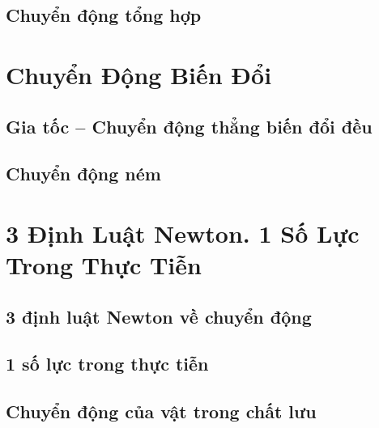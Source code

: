 \documentclass{article}
\numberwithin{equation}{section}
\begin{document}

\subsection{Chuyển động tổng hợp}


\section{Chuyển Động Biến Đổi}

\subsection{Gia tốc -- Chuyển động thẳng biến đổi đều}


\subsection{Chuyển động ném}


\section{3 Định Luật Newton. 1 Số Lực Trong Thực Tiễn}

\subsection{3 định luật Newton về chuyển động}


\subsection{1 số lực trong thực tiễn}


\subsection{Chuyển động của vật trong chất lưu}
\end{document}
